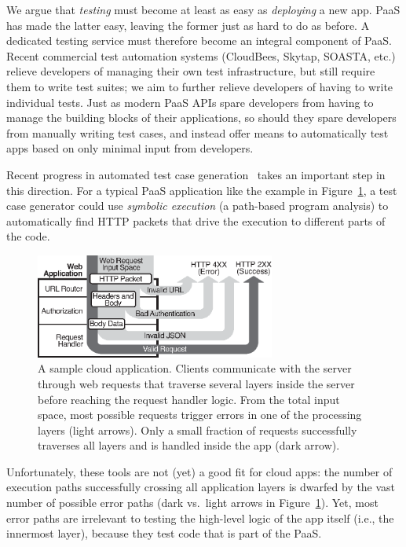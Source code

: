 We argue that {\em testing} must become at least as easy as {\em deploying} a new app. PaaS has made the latter easy, leaving the former just as hard to do as before.  A dedicated testing service must therefore become an integral component of PaaS.
%
Recent commercial test automation systems (CloudBees, Skytap, SOASTA, etc.) relieve developers of managing their own test infrastructure, but still require them to write test suites; we aim to further relieve developers of having to write individual tests.
%
Just as modern PaaS APIs spare developers from having to manage the building blocks of their applications, so should they spare developers from manually writing test cases, and instead offer means to automatically test apps based on only minimal input from developers.

Recent progress in automated test case generation~\cite{klee,godefroid:fuzz,tillmann-pex} takes an important step in this direction.  For a typical PaaS application like the example in Figure~\ref{fig:running-example}, a test case generator could use \textit{symbolic execution} (a path-based program analysis) to automatically find HTTP packets that drive the execution to different parts of the code.
%
\begin{figure}
  \centering
  \includegraphics[width=3.1in]{paas/figures/web-flow}
  \caption{A sample cloud application.  Clients communicate with the server through web requests that traverse several layers inside the server before reaching the request handler logic.  From the total input space, most possible requests trigger errors in one of the processing layers (light arrows).  Only a small fraction of requests successfully traverses all layers and is handled inside the app (dark arrow).}
  \label{fig:running-example}
  \vspace{5pt}
\end{figure}
%
Unfortunately, these tools are not (yet) a good fit for cloud apps: the number of execution paths successfully crossing all application layers is dwarfed by the vast number of possible error paths (dark vs.~light arrows in Figure~\ref{fig:running-example}).  Yet, most error paths are irrelevant to testing the high-level logic of the app itself (i.e., the innermost layer), because they test code that is part of the PaaS.

